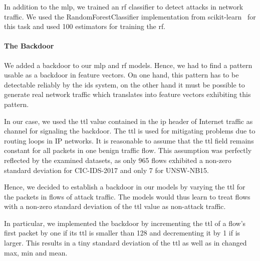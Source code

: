 \documentclass[10pt,sigconf,letterpaper,dvipsnames]{acmart}
\newcommand{\unsw}{UNSW-NB15}
\newcommand{\cic}{CIC-IDS-2017}
\begin{document}
In addition to the \gls{mlp}, we trained an \gls{rf} classifier to detect attacks in network traffic. We used the RandomForestClassifier implementation from scikit-learn~\cite{pedregosa_scikit-learn_2011} for this task and used 100 estimators for training the \gls{rf}.

\paragraph{The Backdoor}

We added a backdoor to our \gls{mlp} and \gls{rf} models. %
Hence,
we
had to find a pattern usable as a backdoor in feature vectors. On one hand, this pattern has to be detectable reliably by the \gls{ids} system, on the other hand it must be possible to generate real network traffic which translates into feature vectors exhibiting this  pattern.

In our case, we used the \gls{ttl} value contained in the \gls{ip} header of Internet traffic
as channel for signaling the backdoor.
The \gls{ttl} is used for mitigating problems due to routing loops in IP networks.
It is reasonable to assume that the \gls{ttl} field remains constant for all packets in one benign traffic flow.
This assumption was perfectly reflected by the examined datasets, as only 965 flows exhibited a non-zero standard deviation for \cic{} and only 7 for \unsw{}.

Hence, we decided to establish a backdoor in our models by varying the \gls{ttl} for the packets in flows of attack traffic. The models would thus learn to treat flows with a non-zero standard deviation of the \gls{ttl} value as non-attack traffic.

In particular, we implemented the backdoor by incrementing the \gls{ttl} of a flow's first packet by one if its \gls{ttl} is smaller than 128 and decrementing it by 1 if is larger. This results in a tiny standard deviation of the \gls{ttl}
as well as in changed max, min and mean.
\end{document}
